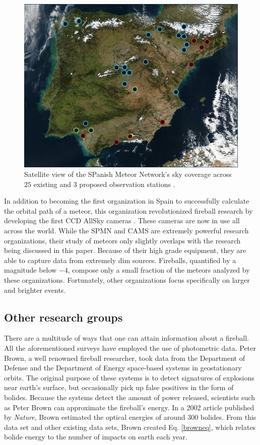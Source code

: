 \begin{figure}[ht!]
  \centering
  \includegraphics[scale=0.3]{images/satalite_of_love.png}
  \caption{Satellite view of the SPanish Meteor Network's sky coverage across $25$ existing and $3$ proposed observation stations  \cite{noauthor_presentation_nodate}.}
  \label{SPan}
\end{figure}

In addition to becoming the first organization in Spain to successfully calculate the orbital path of a meteor, this organization revolutionized fireball research by developing the first CCD AllSky cameras \cite{noauthor_presentation_nodate}.
These cameras are now in use all across the world.
While the SPMN and CAMS are extremely powerful research organizations, their study of meteors only slightly overlaps with the research being discussed in this paper.
Because of their high grade equipment, they are able to capture data from extremely dim sources.
Fireballs, quantified by a magnitude below $-4$, compose only a small fraction of the meteors analyzed by these organizations.
Fortunately, other organizations focus specifically on larger and brighter events.

\subsection{Other research groups}

There are a multitude of ways that one can attain information about a fireball.  
All the aforementioned surveys have employed the use of photometric data.
Peter Brown, a well renowned fireball researcher, took data from the Department of Defense and the Department of Energy space-based systems in geostationary orbits.
The original purpose of these systems is to detect signatures of explosions near earth's surface, but occasionally pick up false positives in the form of bolides.  
Because the systems detect the amount of power released, scientists such as Peter Brown can approximate the fireball's energy.
In a 2002 article published by \textit{Nature}, Brown estimated the optical energies of around 300 bolides.
From this data set and other existing data sets, Brown created Eq. \ref{browneq}, which relates bolide energy to the number of impacts on earth each year. 

